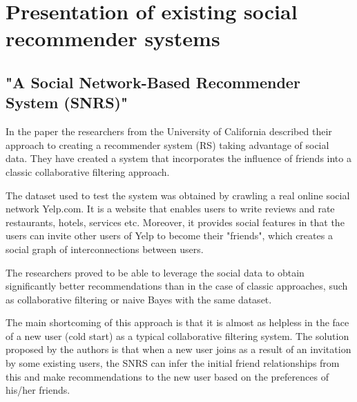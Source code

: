 \documentclass[12pt]{report}
\begin{document}



\chapter[Presentation of existing social recommender...]{Presentation of existing social recommender systems}

\section{"A Social Network-Based Recommender System (SNRS)"}

In the paper \cite{snrs} the researchers from the University of California described their approach to creating a recommender system (RS) taking advantage of social data. They have created a system that incorporates the influence of friends into a classic collaborative filtering approach. 

The dataset used to test the system was obtained by crawling a real online social network Yelp.com. It is a website that enables users to write reviews and rate restaurants, hotels, services etc. Moreover, it provides social features in that the users can invite other users of Yelp to become their "friends", which creates a social graph of interconnections between users.

The researchers proved to be able to leverage the social data to obtain significantly better recommendations than in the case of classic approaches, such as collaborative filtering or naive Bayes with the same dataset. 

\hbox{}
The main shortcoming of this approach is that it is almost as helpless in the face of a new user (cold start) as a typical collaborative filtering system. The solution proposed by the authors is that when a new user joins as a result of an invitation by some existing users, the SNRS can infer the initial friend relationships from this and make recommendations to the new user based on the preferences of his/her friends. 
\end{document}
